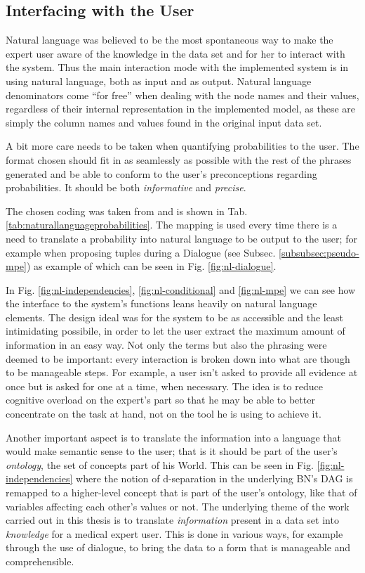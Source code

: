 \subsection{Interfacing with the User}
Natural language was believed to be the most spontaneous way to make the expert user aware of the knowledge in the data set and for her to interact with the system.
Thus the main interaction mode with the implemented system is in using natural language, both as input and as output.
Natural language denominators come \enquote{for free} when dealing with the node names and their values, regardless of their internal representation in the implemented model, as these are simply the column names and values found in the original input data set.

A bit more care needs to be taken when quantifying probabilities to the user.
The format chosen should fit in as seamlessly as possible with the rest of the phrases generated and be able to conform to the user's preconceptions regarding probabilities.
It should be both \textit{informative} and \textit{precise}.

The chosen coding was taken from \cite{Butz2018} and is shown in Tab. \ref{tab:naturallanguageprobabilities}.
The mapping is used every time there is a need to translate a probability into natural language to be output to the user; for example when proposing tuples during a Dialogue (see Subsec. \ref{subsubsec:pseudo-mpe}) as example of which can be seen in Fig. \ref{fig:nl-dialogue}.

In Fig. \ref{fig:nl-independencies}, \ref{fig:nl-conditional} and \ref{fig:nl-mpe} we can see how the interface to the system's functions leans heavily on natural language elements.
The design ideal was for the system to be as accessible and the least intimidating possibile, in order to let the user extract the maximum amount of information in an easy way.
Not only the terms but also the phrasing were deemed to be important: every interaction is broken down into what are though to be manageable steps.
For example, a user isn't asked to provide all evidence at once but is asked for one at a time, when necessary.
The idea is to reduce cognitive overload on the expert's part so that he may be able to better concentrate on the task at hand, not on the tool he is using to achieve it.

Another important aspect is to translate the information into a language that would make semantic sense to the user; that is it should be part of the user's \textit{ontology}, the set of concepts part of his World.
This can be seen in Fig. \ref{fig:nl-independencies} where the notion of d-separation in the underlying BN's DAG is remapped to a higher-level concept that is part of the user's ontology, like that of variables affecting each other's values or not.
The underlying theme of the work carried out in this thesis is to translate \textit{information} present in a data set into \textit{knowledge} for a medical expert user.
This is done in various ways, for example through the use of dialogue, to bring the data to a form that is manageable and comprehensible.

